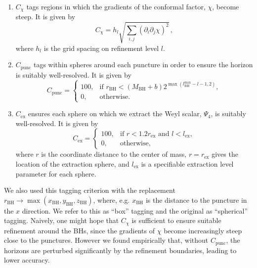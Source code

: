 \documentclass[floats,floatfix,showpacs,amssymb,prd,twocolumn,superscriptaddress,nofootinbib,nolongbibliography,reprint]{revtex4-2}
\begin{document}
\begin{enumerate}[label=(\roman*)]
    \item 
        $C_{\chi}$ tags regions in which the gradients of the conformal 
        factor, $\chi$, become steep. It is given by
        \begin{equation}
            C_{\chi} = h_l\sqrt{\sum_{i,j}\left(
            \partial_i\partial_j\chi\right)^2}\,,
        \end{equation}
        where $h_l$ is the grid spacing on refinement level $l$.
    \item 
        $C_{\mathrm{punc}}$ tags within spheres around each puncture in 
        order to ensure the horizon is suitably well-resolved. It is given 
        by
        \begin{equation}
            C_{\mathrm{punc}} = 
            \begin{cases}
                100, &\text{if } r_{\mathrm{BH}} < 
                (M_{\mathrm{BH}}+b) 2^{\max(l_\mathrm{BH}^{\max}-l-1, 2)}, \\
                0, & \text{otherwise}.
            \end{cases}
        \end{equation}
    \item
        $C_{\mathrm{ex}}$ ensures each sphere on which we extract the 
        Weyl scalar, $\Psi_4$, is suitably well-resolved. It is given by
        \begin{equation}
            C_{\mathrm{ex}} = 
            \begin{cases}
                100, &\text{if } r < 1.2r_{\mathrm{ex}} \text{ and } 
                l < l_{\mathrm{ex}}, \\
                0, & \text{otherwise},
            \end{cases}
        \end{equation}
         where $r$ is the coordinate distance to the center of mass,
         $r=r_{\mathrm{ex}}$ gives the location of the extraction sphere, 
         and $l_{\mathrm{ex}}$ is a specifiable extraction level parameter 
         for each sphere.
\end{enumerate}
We also used this tagging criterion with the replacement
$r_{\mathrm{BH}}\to
\max(x_{\mathrm{BH}},y_{\mathrm{BH}},z_{\mathrm{BH}})$, where,
e.g. $x_{\mathrm{BH}}$ is the distance to the puncture in the $x$
direction. We refer to this as ``box'' tagging and the original as
``spherical'' tagging. Naively, one might hope that $C_{\chi}$ is
sufficient to ensure suitable refinement around the BHs, since the
gradients of $\chi$ become increasingly steep close to the
punctures. However we found empirically that, without
$C_{\text{punc}}$, the horizons are perturbed significantly by the
refinement boundaries, leading to lower accuracy.




\end{document}
